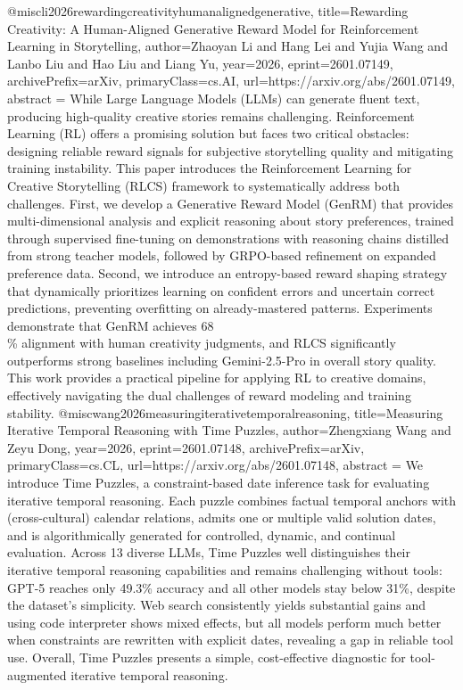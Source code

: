 {}@misc{li2026rewardingcreativityhumanalignedgenerative,
      title={Rewarding Creativity: A Human-Aligned Generative Reward Model for Reinforcement Learning in Storytelling}, 
      author={Zhaoyan Li and Hang Lei and Yujia Wang and Lanbo Liu and Hao Liu and Liang Yu},
      year={2026},
      eprint={2601.07149},
      archivePrefix={arXiv},
      primaryClass={cs.AI},
      url={https://arxiv.org/abs/2601.07149},
      abstract = {While Large Language Models (LLMs) can generate fluent text, producing high-quality creative stories remains challenging. Reinforcement Learning (RL) offers a promising solution but faces two critical obstacles: designing reliable reward signals for subjective storytelling quality and mitigating training instability. This paper introduces the Reinforcement Learning for Creative Storytelling (RLCS) framework to systematically address both challenges. First, we develop a Generative Reward Model (GenRM) that provides multi-dimensional analysis and explicit reasoning about story preferences, trained through supervised fine-tuning on demonstrations with reasoning chains distilled from strong teacher models, followed by GRPO-based refinement on expanded preference data. Second, we introduce an entropy-based reward shaping strategy that dynamically prioritizes learning on confident errors and uncertain correct predictions, preventing overfitting on already-mastered patterns. Experiments demonstrate that GenRM achieves 68\\\% alignment with human creativity judgments, and RLCS significantly outperforms strong baselines including Gemini-2.5-Pro in overall story quality. This work provides a practical pipeline for applying RL to creative domains, effectively navigating the dual challenges of reward modeling and training stability.}
}@misc{wang2026measuringiterativetemporalreasoning,
      title={Measuring Iterative Temporal Reasoning with Time Puzzles}, 
      author={Zhengxiang Wang and Zeyu Dong},
      year={2026},
      eprint={2601.07148},
      archivePrefix={arXiv},
      primaryClass={cs.CL},
      url={https://arxiv.org/abs/2601.07148},
      abstract = {We introduce Time Puzzles, a constraint-based date inference task for evaluating iterative temporal reasoning. Each puzzle combines factual temporal anchors with (cross-cultural) calendar relations, admits one or multiple valid solution dates, and is algorithmically generated for controlled, dynamic, and continual evaluation. Across 13 diverse LLMs, Time Puzzles well distinguishes their iterative temporal reasoning capabilities and remains challenging without tools: GPT-5 reaches only 49.3\% accuracy and all other models stay below 31\%, despite the dataset's simplicity. Web search consistently yields substantial gains and using code interpreter shows mixed effects, but all models perform much better when constraints are rewritten with explicit dates, revealing a gap in reliable tool use. Overall, Time Puzzles presents a simple, cost-effective diagnostic for tool-augmented iterative temporal reasoning.}
}
